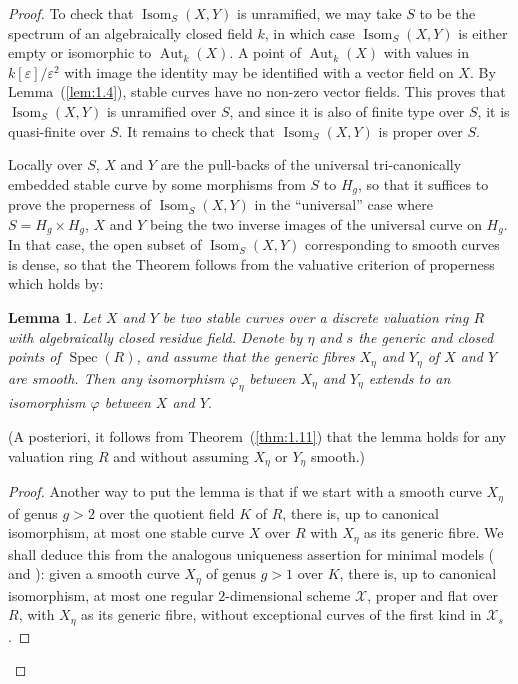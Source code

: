 \documentclass[10pt]{amsart}
\theoremstyle{plain}
\newtheorem{lemma}[theorem]{Lemma}
\theoremstyle{definition}
\DeclareMathOperator{\Aut}{Aut}
\DeclareMathOperator{\Isom}{Isom}
\DeclareMathOperator{\Spec}{Spec}
\begin{document}
\begin{proof}
To check that $\Isom_S(X,Y)$ is unramified, we may take $S$ to be the spectrum of an algebraically closed field $k$, in which case $\Isom_S(X,Y)$ is either empty or isomorphic to $\Aut_k(X)$. A point of $\Aut_k(X)$ with values in $k[\varepsilon]/\varepsilon^2$ with image the identity may be identified with a vector field on $X$. By Lemma~(\ref{lem:1.4}), stable curves have no non-zero vector fields. This proves that $\Isom_S(X,Y)$ is unramified over $S$, and since it is also of finite type over $S$, it is quasi-finite over $S$. It remains to check that $\Isom_S(X,Y)$ is proper over $S$.

Locally over $S$, $X$ and $Y$ are the pull-backs of the universal tri-canonically embedded stable curve by some morphisms from $S$ to $H_g$, so that it suffices to prove the properness of $\Isom_S(X,Y)$ in the ``universal'' case where $S = H_g \times H_g$, $X$ and $Y$ being the two inverse images of the universal curve on $H_g$. In that case, the open subset of $\Isom_S(X,Y)$ corresponding to smooth curves is dense, so that the Theorem follows from the valuative criterion of properness which holds by:

\begin{lemma}\label{lem:1.12}
Let $X$ and $Y$ be two stable curves over a discrete valuation ring $R$ with algebraically closed residue field. Denote by $\eta$ and $s$ the generic and closed points of $\Spec(R)$, and assume that the generic fibres $X_\eta$ and $Y_\eta$ of $X$ and $Y$ are smooth. Then any isomorphism $\varphi_\eta$ between $X_\eta$ and $Y_\eta$ extends to an isomorphism $\varphi$ between $X$ and $Y$.
\end{lemma}

(A posteriori, it follows from Theorem~(\ref{thm:1.11}) that the lemma holds for any valuation ring $R$ and without assuming $X_\eta$ or $Y_\eta$ smooth.)

\begin{proof}
Another way to put the lemma is that if we start with a smooth curve $X_\eta$ of genus $g > 2$ over the quotient field $K$ of $R$, there is, up to canonical isomorphism, at most one stable curve $X$ over $R$ with $X_\eta$ as its generic fibre. We shall deduce this from the analogous uniqueness assertion for minimal models (\cite{L} and \cite{Saf}): given a smooth curve $X_\eta$ of genus $g > 1$ over $K$, there is, up to canonical isomorphism, at most one regular $2$-dimensional scheme $\mathscr{X}$, proper and flat over $R$, with $X_\eta$ as its generic fibre, without exceptional curves of the first kind in $\mathscr{X}_s$.


\end{proof}
\end{proof}
\end{document}
